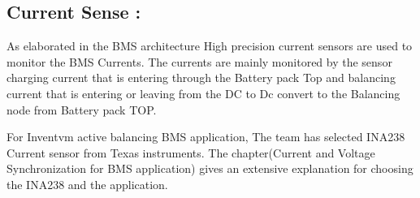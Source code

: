 \subsection{Current Sense :}

As elaborated in the BMS architecture High precision current sensors are used to monitor the BMS Currents. The currents are mainly monitored by the sensor charging current that is entering through the Battery pack Top and balancing current that is entering or leaving from the DC to Dc convert to the Balancing node from Battery pack TOP.

For Inventvm active balancing BMS application, The team has selected INA238 Current sensor from Texas instruments. The chapter(Current and Voltage Synchronization for BMS application) gives an extensive explanation for choosing the INA238\cite{INA238_User_Datasheet} and the application.